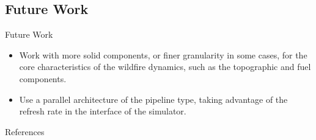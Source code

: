\documentclass{beamer}
\begin{document}
      \subsection{Future Work}
      \begin{frame}{Future Work}
        \begin{itemize}
          \item<1-> Work with more solid components, or finer granularity in some cases, for the core 
            characteristics of the wildfire dynamics, such as the topographic and fuel components.
          \item<2-> Use a parallel architecture of the pipeline type, taking advantage of the refresh 
            rate in the interface of the simulator.
        \end{itemize}
      \end{frame}
      
  \begin{frame}[allowframebreaks]{References}
    
    
  \end{frame}
     
\end{document}
